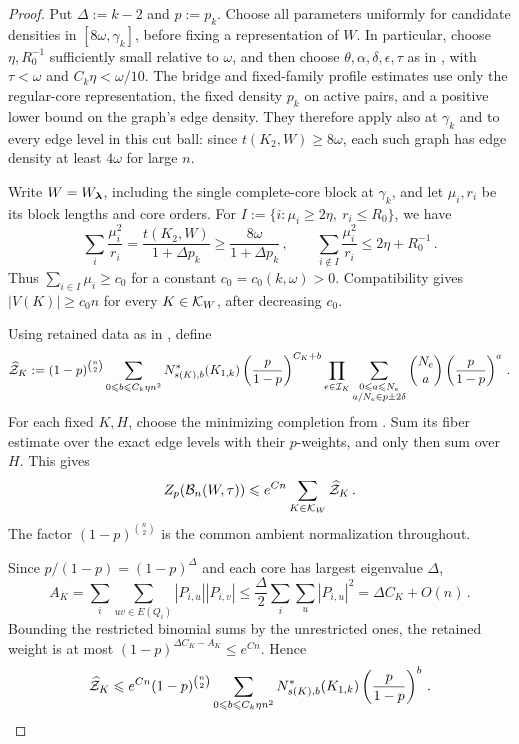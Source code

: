 \begin{proof}
Put $\Delta:=k-2$ and $p:=p_k$. Choose all parameters uniformly for candidate densities in $[8\omega,\gamma_k]$, before fixing a representation of $W$. In particular, choose $\eta,R_0^{-1}$ sufficiently small relative to $\omega$, and then choose $\theta,\alpha,\delta,\epsilon,\tau$ as in , with $\tau<\omega$ and $C_k\eta<\omega/10$. The bridge and fixed-family profile estimates use only the regular-core representation, the fixed density $p_k$ on active pairs, and a positive lower bound on the graph's edge density. They therefore apply also at $\gamma_k$ and to every edge level in this cut ball: since $t(K_2,W)\geq8\omega$, each such graph has edge density at least $4\omega$ for large $n$.

Write $W=W_{\boldsymbol{\lambda}}$, including the single complete-core block at $\gamma_k$, and let $\mu_i,r_i$ be its block lengths and core orders. For $I:=\{i:\mu_i\geq2\eta,\ r_i\leq R_0\}$, we have
$$\sum_i\frac{\mu_i^2}{r_i}=\frac{t(K_2,W)}{1+\Delta p_k}\geq\frac{8\omega}{1+\Delta p_k}\,,\qquad \sum_{i\notin I}\frac{\mu_i^2}{r_i}\leq2\eta+R_0^{-1}\,.$$
Thus $\sum_{i\in I}\mu_i\geq c_0$ for a constant $c_0=c_0(k,\omega)>0$. Compatibility gives $|V(K)|\geq c_0n$ for every $K\in{\mathcal K}_W$, after decreasing $c_0$.

Using retained data as in , define
$$\widehat{{\mathcal Z}}_K:=(1-p)^{\binom n2}\sum_{0\leqslant b\leqslant C_k\eta n^2}N^\ast_{s(K),b}(K_{1,k})\left(\frac{p}{1-p}\right)^{C_K+b}\prod_{e\in{\mathcal I}_K}\sum_{\substack{0\leqslant a\leqslant N_e\\a/N_e\in p\pm2\delta}}\binom{N_e}{a}\left(\frac{p}{1-p}\right)^a\,.$$
For each fixed $K,H$, choose the minimizing completion from . Sum its fiber estimate over the exact edge levels with their $p$-weights, and only then sum over $H$. This gives
\begin{equation}\label{eqn:critical-weighted-upper-K1k}
Z_p({\mathcal B}_n(W,\tau))\leqslant e^{Cn}\sum_{K\in{\mathcal K}_W}\widehat{{\mathcal Z}}_K\,.
\end{equation}
The factor $(1-p)^{\binom n2}$ is the common ambient normalization throughout.

Since $p/(1-p)=(1-p)^\Delta$ and each core has largest eigenvalue $\Delta$,
$$A_K=\sum_{i}\sum_{uv\in E(Q_i)}|P_{i,u}||P_{i,v}|\leq\frac{\Delta}{2}\sum_i\sum_u|P_{i,u}|^2=\Delta C_K+O(n)\,.$$
Bounding the restricted binomial sums by the unrestricted ones, the retained weight is at most $(1-p)^{\Delta C_K-A_K}\leq e^{Cn}$. Hence
\begin{equation}\label{eqn:critical-clean-sparse-side-K1k}
\widehat{{\mathcal Z}}_K\leqslant e^{Cn}(1-p)^{\binom n2}\sum_{0\leqslant b\leqslant C_k\eta n^2}N^\ast_{s(K),b}(K_{1,k})\left(\frac{p}{1-p}\right)^b\,.
\end{equation}


\end{proof}
